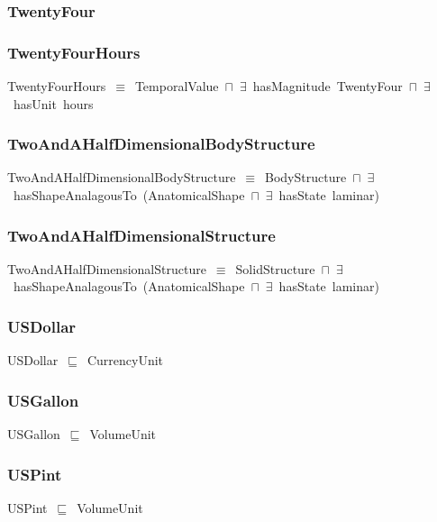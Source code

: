\documentclass{article}
\begin{document}
\subsubsection*{TwentyFour}

\subsubsection*{TwentyFourHours}

TwentyFourHours~\ensuremath{\equiv}~TemporalValue~\ensuremath{\sqcap}~\ensuremath{\exists}~hasMagnitude~TwentyFour~\ensuremath{\sqcap}~\ensuremath{\exists}~hasUnit~hours

\subsubsection*{TwoAndAHalfDimensionalBodyStructure}

TwoAndAHalfDimensionalBodyStructure~\ensuremath{\equiv}~BodyStructure~\ensuremath{\sqcap}~\ensuremath{\exists}~hasShapeAnalagousTo~(AnatomicalShape~\ensuremath{\sqcap}~\ensuremath{\exists}~hasState~laminar)

\subsubsection*{TwoAndAHalfDimensionalStructure}

TwoAndAHalfDimensionalStructure~\ensuremath{\equiv}~SolidStructure~\ensuremath{\sqcap}~\ensuremath{\exists}~hasShapeAnalagousTo~(AnatomicalShape~\ensuremath{\sqcap}~\ensuremath{\exists}~hasState~laminar)

\subsubsection*{USDollar}

USDollar~\ensuremath{\sqsubseteq}~CurrencyUnit~

\subsubsection*{USGallon}

USGallon~\ensuremath{\sqsubseteq}~VolumeUnit~

\subsubsection*{USPint}

USPint~\ensuremath{\sqsubseteq}~VolumeUnit~
\end{document}
